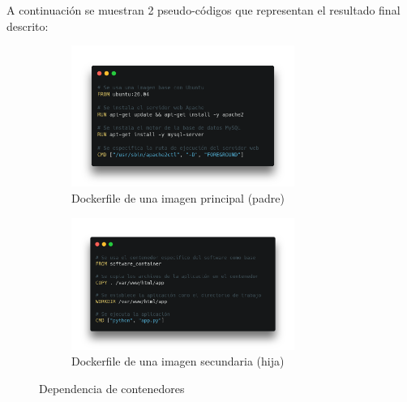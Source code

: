                 A continuación se muestran 2 pseudo-códigos que representan el resultado final descrito:

                \begin{figure}[!htbp]
                    \centering
                    
                    \begin{subfigure}[!htbp]{\textwidth}
                        \centering
                        \includegraphics[width=0.8\textwidth]{images/Contenedor A.png}
                        \caption{Dockerfile de una imagen principal (padre)}
                    \end{subfigure}
                    
                    \begin{subfigure}[!htbp]{\textwidth}
                        \centering
                        \includegraphics[width=0.8\textwidth]{images/Contenedor B.png}
                        \caption{Dockerfile de una imagen secundaria (hija)}
                    \end{subfigure}
                    
                    \caption{Dependencia de contenedores}
                    \label{fig:dependencia-contenedores}
                \end{figure}
                
